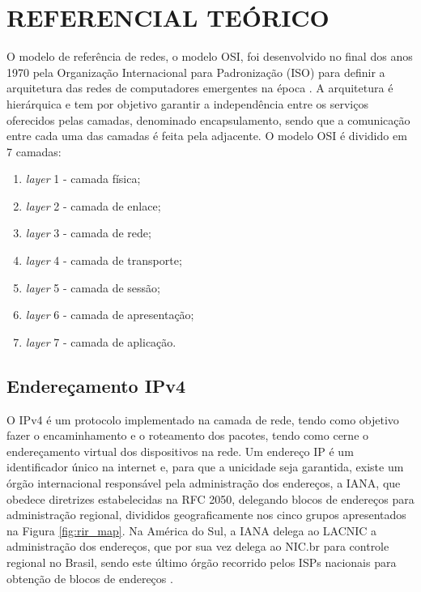 \chapter{REFERENCIAL TEÓRICO}

    O modelo de referência de redes, o modelo OSI, foi desenvolvido no final dos anos 1970 pela Organização Internacional para Padronização (ISO) para definir a arquitetura das redes de computadores emergentes na época \cite{kurose2014}. A arquitetura é hierárquica e tem por objetivo garantir a independência entre os serviços oferecidos pelas camadas, denominado encapsulamento, sendo que a comunicação entre cada uma das camadas é feita pela adjacente. O modelo OSI é dividido em 7 camadas:
    
    \begin{enumerate}[label=\alph*)]
        \item \textit{layer} 1 - camada física;
        \item \textit{layer} 2 - camada de enlace;
        \item \textit{layer} 3 - camada de rede;
        \item \textit{layer} 4 - camada de transporte;
        \item \textit{layer} 5 - camada de sessão;
        \item \textit{layer} 6 - camada de apresentação;
        \item \textit{layer} 7 - camada de aplicação.
    \end{enumerate}
    
\section{Endereçamento IPv4}
    
    O IPv4 é um protocolo implementado na camada de rede, tendo como objetivo fazer o encaminhamento e o roteamento dos pacotes, tendo como cerne o endereçamento virtual dos dispositivos na rede. Um endereço IP é um identificador único na internet e, para que a unicidade seja garantida, existe um órgão internacional responsável pela administração dos endereços, a IANA, que obedece diretrizes estabelecidas na RFC 2050, delegando blocos de endereços para administração regional, divididos geograficamente nos cinco grupos apresentados na Figura \ref{fig:rir_map}. Na América do Sul, a IANA delega ao LACNIC a administração dos endereços, que por sua vez delega ao NIC.br para controle regional no Brasil, sendo este último órgão recorrido pelos ISPs nacionais para obtenção de blocos de endereços \cite{iana2020}.
    
